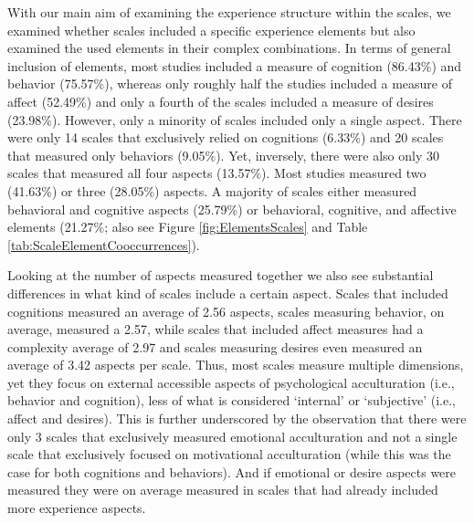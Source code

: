 With our main aim of examining the experience structure within the
scales, we examined whether scales included a specific experience
elements but also examined the used elements in their complex
combinations. In terms of general inclusion of elements, most studies
included a measure of cognition (86.43\%) and behavior (75.57\%),
whereas only roughly half the studies included a measure of affect
(52.49\%) and only a fourth of the scales included a measure of desires
(23.98\%). However, only a minority of scales included only a single
aspect. There were only 14 scales that exclusively relied on cognitions
(6.33\%) and 20 scales that measured only behaviors (9.05\%). Yet,
inversely, there were also only 30 scales that measured all four aspects
(13.57\%). Most studies measured two (41.63\%) or three (28.05\%)
aspects. A majority of scales either measured behavioral and cognitive
aspects (25.79\%) or behavioral, cognitive, and affective elements
(21.27\%; also see Figure \ref{fig:ElementsScales} and Table
\ref{tab:ScaleElementCooccurrences}).

Looking at the number of aspects measured together we also see
substantial differences in what kind of scales include a certain aspect.
Scales that included cognitions measured an average of 2.56 aspects,
scales measuring behavior, on average, measured a 2.57, while scales
that included affect measures had a complexity average of 2.97 and
scales measuring desires even measured an average of 3.42 aspects per
scale. Thus, most scales measure multiple dimensions, yet they focus on
external accessible aspects of psychological acculturation (i.e.,
behavior and cognition), less of what is considered `internal' or
`subjective' (i.e., affect and desires). This is further underscored by
the observation that there were only 3 scales that exclusively measured
emotional acculturation and not a single scale that exclusively focused
on motivational acculturation (while this was the case for both
cognitions and behaviors). And if emotional or desire aspects were
measured they were on average measured in scales that had already
included more experience aspects.

